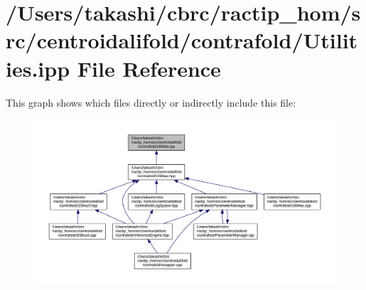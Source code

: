 \hypertarget{centroidalifold_2contrafold_2_utilities_8ipp}{\section{/\+Users/takashi/cbrc/ractip\+\_\+hom/src/centroidalifold/contrafold/\+Utilities.ipp File Reference}
\label{centroidalifold_2contrafold_2_utilities_8ipp}
}
This graph shows which files directly or indirectly include this file\+:
\nopagebreak
\begin{figure}[H]
\begin{center}
\leavevmode
\includegraphics[width=350pt]{centroidalifold_2contrafold_2_utilities_8ipp__dep__incl}
\end{center}
\end{figure}
